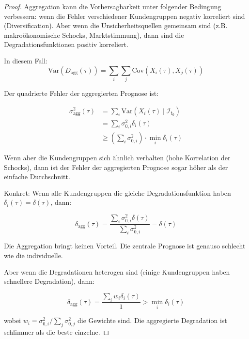 \documentclass[12pt, a4paper, titlepage]{report}
\theoremstyle{definition}
\theoremstyle{remark}
\newcommand{\Var}{\mathrm{Var}}
\newcommand{\Cov}{\mathrm{Cov}}
\begin{document}
\begin{proof}
Aggregation kann die Vorhersagbarkeit unter folgender Bedingung verbessern: wenn die Fehler verschiedener Kundengruppen negativ korreliert sind (Diversification). Aber wenn die Unsicherheitsquellen gemeinsam sind (z.B. makroökonomische Schocks, Marktstimmung), dann sind die Degradationsfunktionen positiv korreliert.

In diesem Fall:
\begin{equation}
\Var(D_{\text{agg}}(\tau)) = \sum_i \sum_j \Cov(X_i(\tau), X_j(\tau))
\end{equation}

Der quadrierte Fehler der aggregierten Prognose ist:

\begin{align}
\sigma_{\text{agg}}^2(\tau) &= \sum_i \Var(X_i(\tau) \mid \mathcal{I}_{t_0}) \\
&= \sum_i \sigma_{0,i}^2 \delta_i(\tau) \\
&\geq \left(\sum_i \sigma_{0,i}^2\right) \cdot \min_i \delta_i(\tau)
\end{align}

Wenn aber die Kundengruppen sich ähnlich verhalten (hohe Korrelation der Schocks), dann ist der Fehler der aggregierten Prognose sogar höher als der einfache Durchschnitt.

Konkret: Wenn alle Kundengruppen die gleiche Degradationsfunktion haben $\delta_i(\tau) = \delta(\tau)$, dann:

\begin{equation}
\delta_{\text{agg}}(\tau) = \frac{\sum_i \sigma_{0,i}^2 \delta(\tau)}{\sum_i \sigma_{0,i}^2} = \delta(\tau)
\end{equation}

Die Aggregation bringt keinen Vorteil. Die zentrale Prognose ist genauso schlecht wie die individuelle.

Aber wenn die Degradationen heterogen sind (einige Kundengruppen haben schnellere Degradation), dann:

\begin{equation}
\delta_{\text{agg}}(\tau) = \frac{\sum_i w_i \delta_i(\tau)}{1} > \min_i \delta_i(\tau)
\end{equation}

wobei $w_i = \sigma_{0,i}^2 / \sum_j \sigma_{0,j}^2$ die Gewichte sind. Die aggregierte Degradation ist schlimmer als die beste einzelne.
\end{proof}
\end{document}
